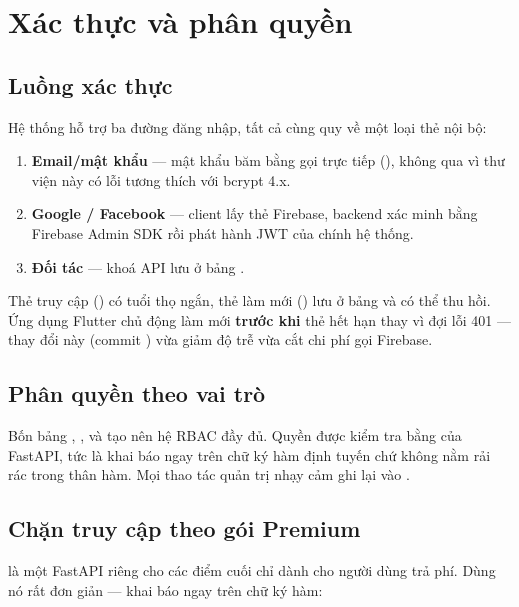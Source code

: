 \section{Xác thực và phân quyền}

\subsection{Luồng xác thực}

Hệ thống hỗ trợ ba đường đăng nhập, tất cả cùng quy về một loại thẻ nội bộ:

\begin{enumerate}[leftmargin=1.4em]
  \item \textbf{Email/mật khẩu} — mật khẩu băm bằng  gọi trực tiếp
  (), không qua  vì thư viện này có lỗi tương thích với
  bcrypt 4.x.
  \item \textbf{Google / Facebook} — client lấy thẻ Firebase, backend xác minh bằng
  Firebase Admin SDK rồi phát hành JWT của chính hệ thống.
  \item \textbf{Đối tác} — khoá API lưu ở bảng .
\end{enumerate}

Thẻ truy cập () có tuổi thọ ngắn, thẻ làm mới () lưu ở
bảng  và có thể thu hồi. Ứng dụng Flutter chủ động làm mới
\textbf{trước khi} thẻ hết hạn thay vì đợi lỗi 401 — thay đổi này (commit
) vừa giảm độ trễ vừa cắt chi phí gọi Firebase.

\subsection{Phân quyền theo vai trò}

Bốn bảng , ,  và 
tạo nên hệ RBAC đầy đủ. Quyền được kiểm tra bằng  của FastAPI, tức là khai
báo ngay trên chữ ký hàm định tuyến chứ không nằm rải rác trong thân hàm. Mọi thao tác
quản trị nhạy cảm ghi lại vào .

\subsection{Chặn truy cập theo gói Premium}

 là một  FastAPI riêng cho các điểm cuối chỉ dành
cho người dùng trả phí. Dùng nó rất đơn giản — khai báo ngay trên chữ ký hàm:

